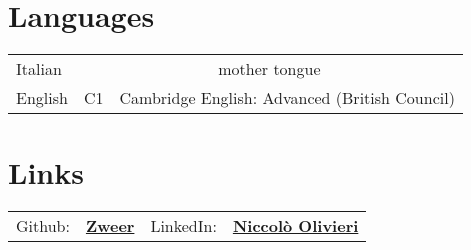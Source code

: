 \documentclass[letterpaper]{deedy-resume} %
\begin{document}
\begin{minipage}[t]{0.66\textwidth}
\sectionspace %



\sectionspace %


\section{Languages}

\begin{tabular}{lcl}
Italian & \multicolumn{2}{c}{mother tongue}\\
English & C1 & Cambridge English: Advanced (British Council)
\end{tabular}

\sectionspace %


\section{Links} 

\begin{tabular}{rlrl}
Github: & \href{https://github.com/Zweer}{\bf Zweer} &
LinkedIn: & \href{http://lnkd.in/b9ZrkZq}{\bf Niccolò Olivieri} \\
\end{tabular}




\end{minipage}
\end{document}
